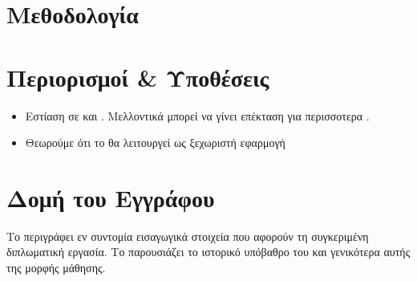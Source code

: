 \section{Μεθοδολογία}

\section{Περιορισμοί \& Υποθέσεις}
\begin{itemize}
  \item Εστίαση σε  και . Μελλοντικά μπορεί να γίνει επέκταση για περισσοτερα .
  \item Θεωρούμε ότι το  θα λειτουργεί ως ξεχωριστή εφαρμογή 
\end{itemize}

\section{Δομή του Εγγράφου}
Το  περιγράφει εν συντομία εισαγωγικά στοιχεία που αφορούν τη συγκεριμένη διπλωματική εργασία.
Το  παρουσιάζει το ιστορικό υπόβαθρο του  και γενικότερα αυτής της μορφής μάθησης.